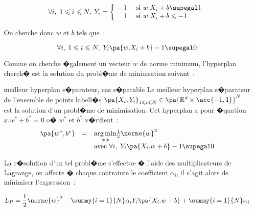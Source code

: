             $$
            \forall i, \; 1 \leqslant i \leqslant N, \; 
                        Y_i = \left\{ \begin{array}{rl}
                                                        -1 & \text{ si } w.X_i + b \supegal 1 \\ 
                                                         1 & \text{ si } w.X_i + b \leqslant -1
                                                    \end{array} \right.
            $$

On cherche donc $w$ et $b$ tels que~:

            $$
            \forall i, \; 1 \leqslant i \leqslant N, \; 
                        Y_i \pa{ w.X_i + b} - 1 \supegal 0
            $$

Comme on cherche �galement un vecteur $w$ de norme minimum, l'hyperplan cherch� est la solution du probl�me de minimsation suivant~:


            \begin{xproblem}{meilleur hyperplan s�parateur, cas s�parable}\label{svm_problem_def}
            Le meilleur hyperplan s�parateur de l'ensemble de points labell�s
            $\pa{X_i,Y_i}_{1 \leqslant i \leqslant N} \in \pa{ \mathbb{R}^d \times \acc{-1,1} }^N$ est la solution
            d'un probl�me de minimisation. Cet hyperplan a pour �quation $x.w^* + b^* = 0$ o� 
            $w^*$ et $b^*$ v�rifient~:
                    $$
                    \begin{array}{rcl}    \pa{w^*,b^*} &=& \underset{w,b}{\arg \min} \frac{1}{2} \norme{w}^2 \\
                                         && \text{avec } \forall i, \; Y_i \pa{ X_i .w + b } -1 \supegal 0 
                    \end{array}                                        
                    $$
            \end{xproblem}


La r�solution d'un tel probl�me s'effectue � l'aide des multiplicateurs de Lagrange, on affecte � chaque contrainte le coefficient $\alpha_i$, il s'agit alors de minimiser l'expression~:

            \begin{eqnarray}
            L_P = \frac{1}{2} \norme{w}^2 - \summy{i=1}{N} \alpha_i Y_i \pa{ X_i . w + b } + \summy{i=1}{N} \alpha_i
            \label{svm_lagrange_lineaire}
            \end{eqnarray}

